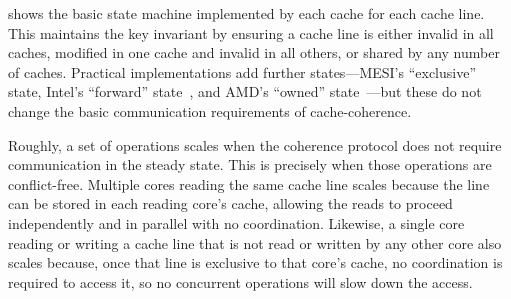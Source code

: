 \begin{figure}
  \centering
  \label{fig:mesi}
\end{figure}

 shows the basic state machine implemented by each
cache for each cache line.  This maintains the key invariant by
ensuring a cache line is either invalid in all caches, modified in one
cache and invalid in all others, or shared by any number of caches.
Practical implementations add further states---MESI's ``exclusive''
state, Intel's ``forward'' state~\cite{goodman:mesif}, and AMD's
``owned'' state~\cite[\S7.3]{amd-arch-2}---but these do not change the
basic communication requirements of cache-coherence.

Roughly, a set of operations scales when the coherence protocol does
not require communication in the steady state.  This is precisely when
those operations are conflict-free.  Multiple cores reading the same
cache line scales because the line can be stored in each reading
core's cache, allowing the reads to proceed independently and in
parallel with no coordination.  Likewise, a single core reading or
writing a cache line that is not read or written by any other core
also scales because, once that line is exclusive to that core's cache,
no coordination is required to access it, so no concurrent operations
will slow down the access.

